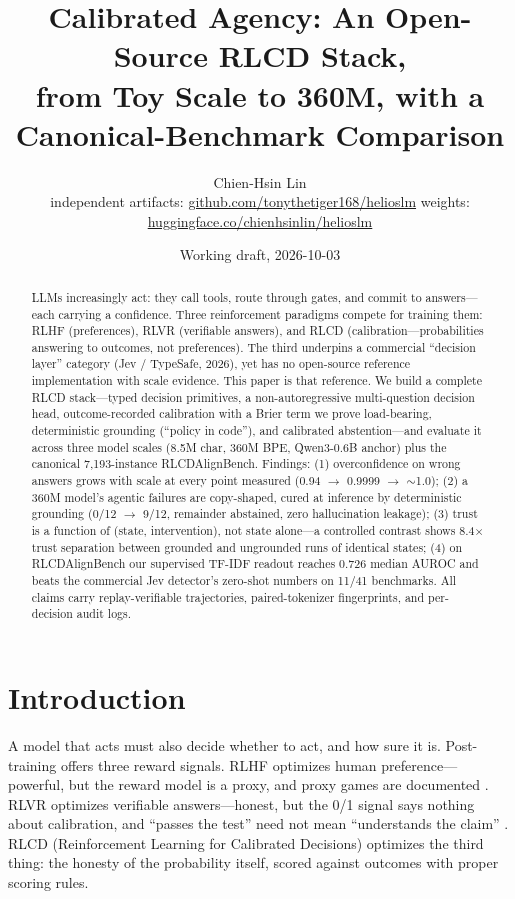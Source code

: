 \documentclass[11pt]{article}
\title{Calibrated Agency: An Open-Source RLCD Stack,\\from Toy Scale to 360M, with a Canonical-Benchmark Comparison}
\author{Chien-Hsin Lin\\
\small independent \quad artifacts: \url{github.com/tonythetiger168/helioslm} \; weights: \url{huggingface.co/chienhsinlin/helioslm}}
\date{Working draft, 2026-10-03}
\begin{document}
\maketitle

\begin{abstract}
LLMs increasingly act: they call tools, route through gates, and commit
to answers---each carrying a confidence. Three reinforcement paradigms
compete for training them: RLHF (preferences), RLVR (verifiable
answers), and RLCD (calibration---probabilities answering to outcomes,
not preferences). The third underpins a commercial ``decision layer''
category (Jev / TypeSafe, 2026), yet has no open-source reference
implementation with scale evidence. This paper is that reference. We
build a complete RLCD stack---typed decision primitives, a
non-autoregressive multi-question decision head, outcome-recorded
calibration with a Brier term we prove load-bearing, deterministic
grounding (``policy in code''), and calibrated abstention---and evaluate
it across three model scales (8.5M char, 360M BPE, Qwen3-0.6B anchor)
plus the canonical 7,193-instance RLCDAlignBench. Findings: (1)
overconfidence on wrong answers grows with scale at every point
measured (0.94 $\to$ 0.9999 $\to$ $\sim$1.0); (2) a 360M model's
agentic failures are copy-shaped, cured at inference by deterministic
grounding (0/12 $\to$ 9/12, remainder abstained, zero hallucination
leakage); (3) trust is a function of (state, intervention), not state
alone---a controlled contrast shows 8.4$\times$ trust separation between
grounded and ungrounded runs of identical states; (4) on RLCDAlignBench
our supervised TF-IDF readout reaches 0.726 median AUROC and beats the
commercial Jev detector's zero-shot numbers on 11/41 benchmarks. All
claims carry replay-verifiable trajectories, paired-tokenizer
fingerprints, and per-decision audit logs.
\end{abstract}

\section{Introduction}

A model that acts must also decide whether to act, and how sure it is.
Post-training offers three reward signals. RLHF optimizes human
preference---powerful, but the reward model is a proxy, and proxy games
are documented \citep{ouyang2022rlhf}. RLVR optimizes verifiable
answers---honest, but the 0/1 signal says nothing about calibration,
and ``passes the test'' need not mean ``understands the claim''
\citep{deepseekr1}. RLCD (Reinforcement Learning for Calibrated
Decisions) optimizes the third thing: the honesty of the probability
itself, scored against outcomes with proper scoring rules.
\end{document}
